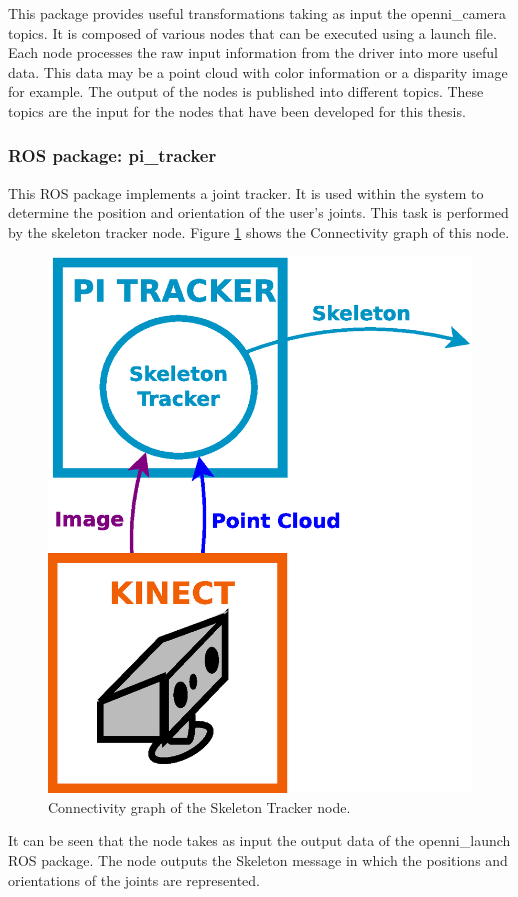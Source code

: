 This package provides useful transformations taking as input the openni\_camera topics. %
It is composed of various nodes that can be executed using a launch file. 
Each node processes the raw input information from the driver into more useful data. 
This data may be a point cloud with color information or a disparity image for example. 
The output of the nodes is published into different topics. 
These topics are the input for the nodes that have been developed for this thesis.

\subsubsection{ROS package: pi\_tracker}

This ROS package implements a joint tracker.
It is used within the system to determine the position and orientation of the user's joints. 
This task is performed by the skeleton tracker node.  
Figure \ref{diagram_skeleton} shows the Connectivity graph of this node. 

		\begin{figure}[H]
			\begin{center}
			\includegraphics[width=0.3\linewidth]{img/diagrams/node_pi_tracker.eps}
			\caption[Skeleton Tracker I/O]{Connectivity graph of the Skeleton Tracker node.}
			\label{diagram_skeleton}
			\end{center}
		\end{figure}

It can be seen that the node takes as input the output data of the openni\_launch ROS package. 
The node outputs the Skeleton message in which the positions and orientations of the joints are represented. 



